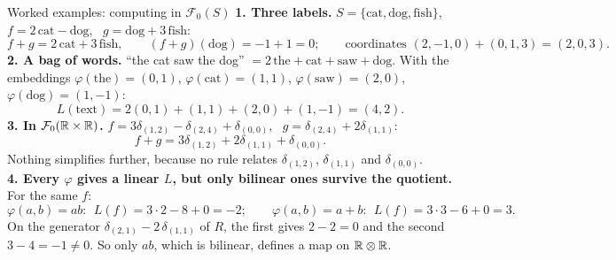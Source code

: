 \documentclass[aspectratio=1610,11pt]{beamer}
\begin{document}
\begin{frame}{Worked examples: computing in $\mathcal{F}_0(S)$}
    \small
    \textbf{1. Three labels.} $S = \{\text{cat}, \text{dog}, \text{fish}\}$, \ $f = 2\,\text{cat} - \text{dog}$, \ $g = \text{dog} + 3\,\text{fish}$:
    \[f + g = 2\,\text{cat} + 3\,\text{fish}, \qquad (f + g)(\text{dog}) = -1 + 1 = 0; \qquad \text{coordinates } (2, -1, 0) + (0, 1, 3) = (2, 0, 3).\]
    \textbf{2. A bag of words.} ``the cat saw the dog'' $= 2\,\text{the} + \text{cat} + \text{saw} + \text{dog}$. With the embeddings $\varphi(\text{the}) = (0, 1)$, $\varphi(\text{cat}) = (1, 1)$, $\varphi(\text{saw}) = (2, 0)$, $\varphi(\text{dog}) = (1, -1)$:
    \[L(\text{text}) = 2(0, 1) + (1, 1) + (2, 0) + (1, -1) = (4, 2).\]
    \textbf{3. In $\mathcal{F}_0(\mathbb{R} \times \mathbb{R})$.} $f = 3\delta_{(1, 2)} - \delta_{(2, 4)} + \delta_{(0, 0)}$, \ $g = \delta_{(2, 4)} + 2\delta_{(1, 1)}$:
    \[f + g = 3\delta_{(1, 2)} + 2\delta_{(1, 1)} + \delta_{(0, 0)}.\]
    Nothing simplifies further, because no rule relates $\delta_{(1, 2)}$, $\delta_{(1, 1)}$ and $\delta_{(0, 0)}$.
    \\[0.4em]
    \textbf{4. Every $\varphi$ gives a linear $L$, but only bilinear ones survive the quotient.} For the same $f$:
    \[\varphi(a, b) = ab: \ \ L(f) = 3 \cdot 2 - 8 + 0 = -2; \qquad \varphi(a, b) = a + b: \ \ L(f) = 3 \cdot 3 - 6 + 0 = 3.\]
    On the generator $\delta_{(2, 1)} - 2\,\delta_{(1, 1)}$ of $R$, the first gives $2 - 2 = 0$ and the second $3 - 4 = -1 \neq 0$. So only $ab$, which is bilinear, defines a map on $\mathbb{R} \otimes \mathbb{R}$.
\end{frame}
\end{document}
